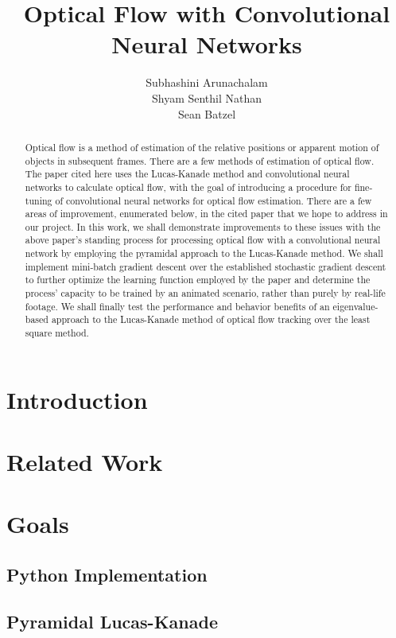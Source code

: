\documentclass[]{article}
\title{Optical Flow with Convolutional Neural Networks}
\author{Subhashini Arunachalam\\Shyam Senthil Nathan\\Sean Batzel}
\begin{document}
\maketitle

\nocite{*}

\pagebreak
\begin{abstract}
    Optical flow is a method of estimation of the relative positions or apparent motion of objects in
    subsequent frames. There are a few methods of estimation of optical flow. The paper cited here uses the
    Lucas-Kanade method and convolutional neural networks to calculate optical flow, with the goal of
    introducing a procedure for fine-tuning of convolutional neural networks for optical flow estimation.
    There are a few areas of improvement, enumerated below, in the cited paper that we hope to address in
    our project. In this work, we shall demonstrate improvements to these issues with the above paper’s
    standing process for processing optical flow with a convolutional neural network by employing the
    pyramidal approach to the Lucas-Kanade method. We shall implement mini-batch gradient descent over
    the established stochastic gradient descent to further optimize the learning function employed by the
    paper and determine the process’ capacity to be trained by an animated scenario, rather than purely by
    real-life footage. We shall finally test the performance and behavior benefits of an eigenvalue-based
    approach to the Lucas-Kanade method of optical flow tracking over the least square method.
\end{abstract}

\section{Introduction}

\section{Related Work}

\section{Goals}
\subsection{Python Implementation}
\subsection{Pyramidal Lucas-Kanade}
\end{document}
